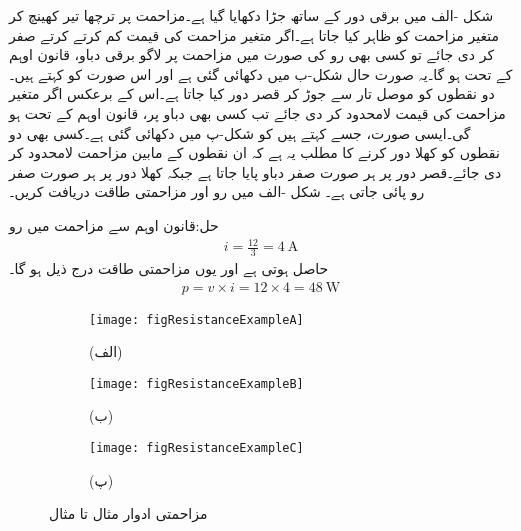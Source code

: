 شکل -الف میں برقی دور کے ساتھ  جڑا دکھایا گیا ہے۔مزاحمت پر ترچھا تیر کھینچ کر متغیر مزاحمت کو ظاہر کیا جاتا ہے۔اگر متغیر مزاحمت کی قیمت کم کرتے کرتے صفر کر دی جائے تو کسی بھی رو  کی صورت میں مزاحمت پر لاگو برقی دباو، قانون اوہم کے تحت  ہو گا۔یہ صورت حال شکل-ب میں دکھائی گئی ہے اور اس صورت کو  کہتے ہیں۔ دو نقطوں کو موصل تار سے جوڑ کر قصر دور کیا جاتا ہے۔اس کے برعکس اگر متغیر مزاحمت کی قیمت لامحدود کر دی جائے تب کسی بھی دباو  پر، قانون اوہم کے تحت  ہو گی۔ایسی صورت، جسے  کہتے ہیں کو شکل-پ میں دکھائی گئی ہے۔کسی بھی دو نقطوں کو کھلا دور کرنے کا مطلب یہ ہے کہ ان  نقطوں کے مابین مزاحمت لامحدود کر دی جائے۔قصر دور پر ہر صورت صفر دباو پایا جاتا ہے جبکہ کھلا دور پر ہر صورت صفر رو پائی جاتی ہے۔
شکل -الف میں رو اور مزاحمتی طاقت دریافت کریں۔

حل:قانون اوہم سے مزاحمت میں رو
\begin{align*}
i=\frac{12}{3}=\SI{4}{\ampere}
\end{align*}
حاصل ہوتی ہے اور یوں مزاحمتی طاقت درج ذیل ہو گا۔
\begin{align*}
p=v \times i =12 \times 4=\SI{48}{\watt}
\end{align*}

\begin{figure}
\centering
\begin{subfigure}{0.3\textwidth}
\texttt{[image: figResistanceExampleA]}
\caption*{(الف)}
\end{subfigure}%
%
\begin{subfigure}{0.3\textwidth}
\texttt{[image: figResistanceExampleB]}
\caption*{(ب)}
\end{subfigure}%
%
\begin{subfigure}{0.3\textwidth}
\texttt{[image: figResistanceExampleC]}
\caption*{(پ)}
\end{subfigure}
\caption{مزاحمتی ادوار مثال  تا مثال }
\label{شکل_مزاحمتی_اکلوتا_مزاحمت_کی_طاقت}
\end{figure}

